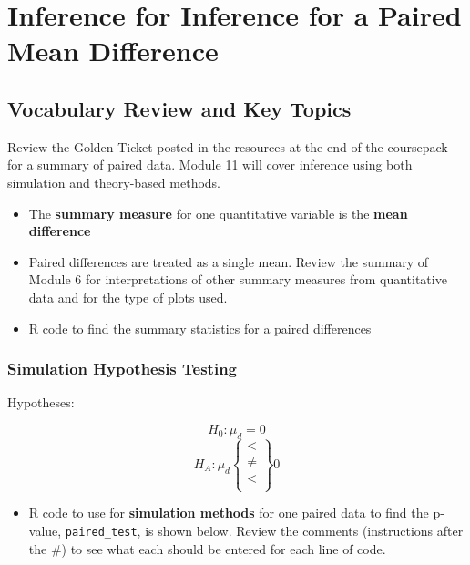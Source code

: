 \documentclass[
]{report}
\providecommand{\tightlist}{%
  \setlength{\itemsep}{0pt}\setlength{\parskip}{0pt}}
\begin{document}
\nocite{*}

\chapter{Inference for Inference for a Paired Mean Difference}\label{inference-for-inference-for-a-paired-mean-difference}

\section{Vocabulary Review and Key Topics}\label{vocabulary-review-and-key-topics}

Review the Golden Ticket posted in the resources at the end of the coursepack for a summary of paired data. Module 11 will cover inference using both simulation and theory-based methods.

\begin{itemize}
\item
  The \textbf{summary measure} for one quantitative variable is the \textbf{mean difference}
\item
  Paired differences are treated as a single mean. Review the summary of Module 6 for interpretations of other summary measures from quantitative data and for the type of plots used.
\item
  R code to find the summary statistics for a paired differences
\end{itemize}

\subsection*{Simulation Hypothesis Testing}\label{simulation-hypothesis-testing}

Hypotheses:

\[H_0: \mu_d = 0\]
\[H_A: \mu_d\left\{
\begin{array}{ll}
< \\
\ne \\
< \\
\end{array}
\right\}
0 \]

\begin{itemize}
\tightlist
\item
  R code to use for \textbf{simulation methods} for one paired data to find the p-value, \texttt{paired\_test}, is shown below. Review the comments (instructions after the \#) to see what each should be entered for each line of code.
\end{itemize}
\end{document}
